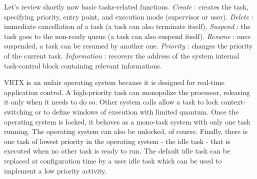 \documentclass[10pt]{report}
\begin{document}
Let's review shortly now basic tasks-related functions. {\em Create} : creates the task, specifying priority, entry point, 
and execution mode (supervisor or user). {\em Delete} : immediate cancellation of a 
task (a task can also terminate itself). {\em Suspend} : the task goes 
to the non-ready queue (a task can also suspend itself). {\em Resume} : once suspended, a task 
can be resumed by another one. {\em Priority} : changes the priority of the current task. {\em Information} : recovers 
the address of the system internal task-control block containing relevant informations.

VRTX is an unfair operating system because it is designed for 
real-time application control. A high-priority task can 
monopolize the processor, releasing it only when it needs to do 
so. Other system calls allow a task to lock context-switching or 
to define windows of execution with limited quantum. Once the 
operating system is locked, it behaves as a mono-task system with 
only one task running. The operating system can also be unlocked, 
of course. Finally, there is one task of lowest priority in the 
operating system - the idle task - that is executed when no other 
task is ready to run. The default idle task can be replaced at 
configuration time by a user idle task which can be used to 
implement a low priority activity.
\end{document}

